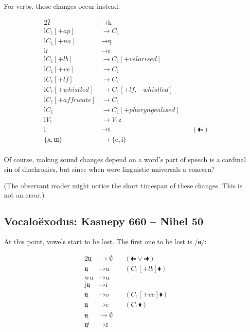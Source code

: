 \documentclass{book}
\begin{document}
For verbs, these changes occur instead:

\begin{alignat*}{2}
  \text{ʔ} &\rightarrow \text{k} \\
  \text{l} C_1[+ap] &\rightarrow C_1 \\
  \text{l} C_1[+na] &\rightarrow \text{ŋ} \\
  \text{lɾ} &\rightarrow \text{r} \\
  \text{l} C_1[+lb] &\rightarrow C_1[+velarised] \\
  \text{l} C_1[+ve] &\rightarrow C_1 \\
  \text{l} C_1[+lf] &\rightarrow C_1 \\
  \text{l} C_1[+whistled] &\rightarrow C_1[+lf, -whistled] \\
  \text{l} C_1[+affricate] &\rightarrow C_1 \\
  \text{l} C_1 &\rightarrow C_1[+pharyngealised] \\
  \text{l} V_1 &\rightarrow V_1 \text{z} \\
  \text{l} &\rightarrow \text{t}  &\quad(\blacklozenge \square) \\
  \{\text{ʌ}, \text{ɯ}\} &\rightarrow \{\text{e}, \text{i}\} \\
\end{alignat*}

Of course, making sound changes depend on a word's part of speech is a cardinal sin of diachronics, but since when were linguistic universals a concern?

(The observant reader might notice the short timespan of these changes. This is not an error.)

\subsection{Vocaloëxodus: Kasnepy 660 -- Nihel 50}

At this point, vowels start to be lost. The first one to be lost is /ʉ̜/:

\begin{alignat*}{2}
  \text{ʉ̜} &\rightarrow \emptyset &\quad(\blacklozenge \square \lor \square \blacklozenge) \\
  \text{ʉ̜} &\rightarrow \text{u} &\quad(C_1[+lb] \blacklozenge) \\
  \text{wu} &\rightarrow \text{u} \\
  \text{jʉ̜} &\rightarrow \text{i} \\
  \text{ʉ̜} &\rightarrow \text{o} &\quad(C_1[+ve] \blacklozenge) \\
  \text{ʉ̜} &\rightarrow \text{e} &\quad(C_1 \blacklozenge) \\
  \text{ʉ̜} &\rightarrow \emptyset \\
  \text{ʉ̜ˡ} &\rightarrow \text{ɹ}
\end{alignat*}
\end{document}
